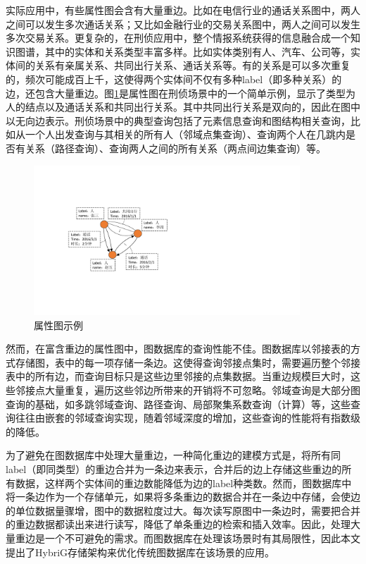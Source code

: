 实际应用中，有些属性图会含有大量重边。比如在电信行业的通话关系图中，两人之间可以发生多次通话关系；又比如金融行业的交易关系图中，两人之间可以发生多次交易关系。更复杂的，在刑侦应用中，整个情报系统获得的信息融合成一个知识图谱\supercite{knowledge_graph}，其中的实体和关系类型丰富多样。比如实体类别有人、汽车、公司等，实体间的关系有亲属关系、共同出行关系、通话关系等。有的关系是可以多次重复的，频次可能成百上千，这使得两个实体间不仅有多种label（即多种关系）的边，还包含大量重边。图\ref{fig:property_graph}是属性图在刑侦场景中的一个简单示例，显示了类型为人的结点以及通话关系和共同出行关系。其中共同出行关系是双向的，因此在图中以无向边表示。刑侦场景中的典型查询包括了元素信息查询和图结构相关查询，比如从一个人出发查询与其相关的所有人（邻域点集查询）、查询两个人在几跳内是否有关系（路径查询）、查询两人之间的所有关系（两点间边集查询）等。

\begin{figure}[htbp]
\centering
\includegraphics[width=100mm]{fig/property_graph.pdf}
\caption{属性图示例}
\label{fig:property_graph}
\end{figure}



然而，在富含重边的属性图中，图数据库的查询性能不佳。图数据库以邻接表的方式存储图，表中的每一项存储一条边。这使得查询邻接点集时，需要遍历整个邻接表中的所有边，而查询目标只是这些边里邻接的点集数据。当重边规模巨大时，这些邻接点大量重复，遍历这些邻边所带来的开销将不可忽略。邻域查询是大部分图查询的基础，如多跳邻域查询、路径查询、局部聚集系数查询（计算）等，这些查询往往由嵌套的邻域查询实现，随着邻域深度的增加，这些查询的性能将有指数级的降低。

为了避免在图数据库中处理大量重边，一种简化重边的建模方式是，将所有同label（即同类型）的重边合并为一条边来表示，合并后的边上存储这些重边的所有数据，这样两个实体间的重边数能降低为边的label种类数。然而，图数据库中将一条边作为一个存储单元，如果将多条重边的数据合并在一条边中存储，会使边的单位数据量骤增，图中的数据粒度过大。每次读写原图中一条边时，需要把合并的重边数据都读出来进行读写，降低了单条重边的检索和插入效率。因此，处理大量重边是一个不可避免的需求。而图数据库在处理该场景时有其局限性，因此本文提出了HybriG存储架构来优化传统图数据库在该场景的应用。


